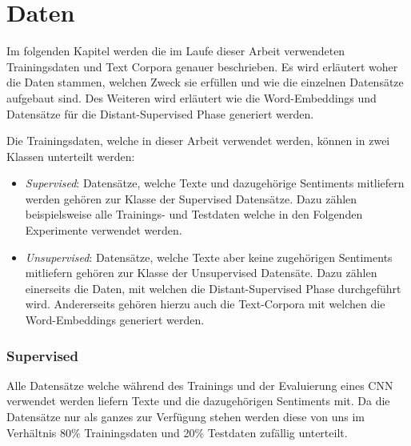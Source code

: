 \chapter{Daten}
\label{chapter:data}
Im folgenden Kapitel werden die im Laufe dieser Arbeit verwendeten Trainingsdaten und Text Corpora genauer beschrieben. Es wird erläutert woher die Daten stammen, welchen Zweck sie erfüllen und wie die einzelnen Datensätze aufgebaut sind. Des Weiteren wird erläutert wie die Word-Embeddings und Datensätze für die Distant-Supervised Phase generiert werden.

Die Trainingsdaten, welche in dieser Arbeit verwendet werden, können in zwei Klassen unterteilt werden:

\begin{itemize}
	\item \emph{Supervised}: Datensätze, welche Texte und dazugehörige Sentiments mitliefern werden gehören zur Klasse der Supervised Datensätze. Dazu zählen beispielsweise alle Trainings- und Testdaten welche in den Folgenden Experimente verwendet werden.
	\item \emph{Unsupervised}: Datensätze, welche Texte aber keine zugehörigen Sentiments mitliefern gehören zur Klasse der Unsupervised Datensäte. Dazu zählen einerseits die Daten, mit welchen die Distant-Supervised Phase durchgeführt wird. Andererseits gehören hierzu auch die Text-Corpora mit welchen die Word-Embeddings generiert werden.
\end{itemize}

\clearpage

\subsection{Supervised}
\label{data:supervised_data}
Alle Datensätze welche während des Trainings und der Evaluierung eines \gls{CNN} verwendet werden liefern Texte und die dazugehörigen Sentiments mit. Da die Datensätze nur als ganzes zur Verfügung stehen werden diese von uns im Verhältnis 80\% Trainingsdaten und 20\% Testdaten zufällig unterteilt.
